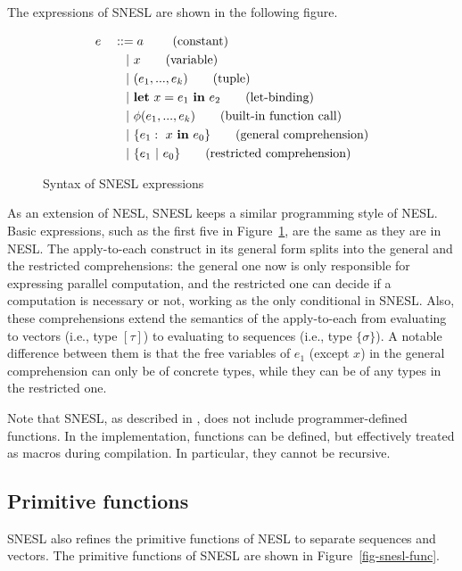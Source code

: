 The expressions of SNESL are shown in the following figure.

\begin{figure}[H]\large 
\begin{alignat*}{2}
& e &&::=  a \     \tag{constant} \\
&   && \quad | \ x  \tag{variable} \\
&   && \quad | \ (e_1,...,e_k) \tag{tuple}\\
&   && \quad | \ \mathbf{let} \ x = e_1 \ \mathbf{in} \ e_2 \tag{let-binding}\\
&   && \quad | \ \phi{(e_1,...,e_k)}  \tag{built-in function call} \\
&   && \quad | \ \{e_1: \ x \ \mathbf{in} \ e_0 \} \tag{general comprehension} \\
&   && \quad | \ \{e_1 \ | \ e_0 \}\tag {restricted comprehension} 
\end{alignat*}
\caption{Syntax of SNESL expressions \label{fig-snesl-exps}}
\end{figure}

As an extension of NESL, SNESL keeps a similar programming style of NESL. 
Basic expressions, such as the first five in Figure~\ref{fig-snesl-exps}, are the same as they are in NESL. 
The apply-to-each construct in its general form splits into the general and the restricted comprehensions:
the general one now is only responsible for expressing parallel computation,
and the restricted one can decide if a computation is necessary or not, working as the only conditional in SNESL.
Also, these comprehensions extend the semantics of the apply-to-each from evaluating to vectors (i.e., type $[\tau]$) to evaluating to sequences (i.e., type $\{\sigma\}$). 
A notable difference between them is that the free variables of $e_1$ (except $x$) in the general comprehension can only be of concrete types, while they can be of any types in the restricted one.

Note that SNESL, as described in \cite{Fphd}, does not include programmer-defined functions. 
In the implementation, functions can be defined, but effectively treated as macros during compilation.
In particular, they cannot be recursive.

\subsection{Primitive functions}

SNESL also refines the primitive functions of NESL to separate sequences and vectors.
The primitive functions of SNESL are shown in Figure~\ref{fig-snesl-func}.

